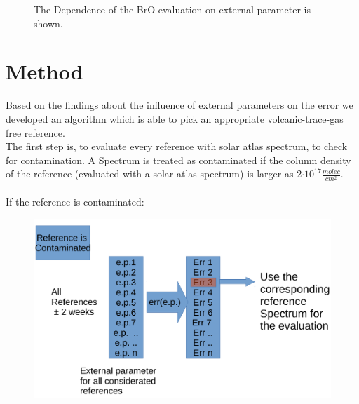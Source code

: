\documentclass  [
  paper    = a4,
  BCOR     = 10mm,
  twoside,
  fontsize = 12pt,
  fleqn,
  toc      = bibnumbered,
  toc      = listofnumbered,
  numbers  = noendperiod,
  headings = normal,
  listof   = leveldown,
  version  = 3.03
]                                       {scrreprt}
\begin{document}
\begin{figure}
{		}
		\caption{The Dependence of the BrO evaluation on external parameter is shown. }
		\label{fig:alldatacorrwithbrodaytime-plumebro}
	\end{figure}
	
	
	\chapter{Method}
	Based on the findings about the influence of external parameters on the  error we developed an algorithm which is able to pick an appropriate volcanic-trace-gas free reference.\\ 
	The first step is, to evaluate every reference with solar atlas spectrum, to check for contamination.	A Spectrum is treated as contaminated if the  column density of the reference (evaluated with a solar atlas spectrum) is larger as 2$\cdot 10^{17}\frac{molec}{cm^2}$.\\
	\\
	If the reference is contaminated:
	\begin{figure}
\centering
\includegraphics[width=0.7\linewidth]{Bilder/Cont}
\caption{}
\label{fig:Cont}
\end{figure}
\end{document}
